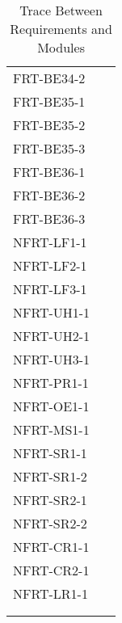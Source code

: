 \documentclass[12pt, titlepage]{article}
\begin{document}
\begin{longtable}{p{} p{}}
	FRT-BE34-2            & ~                \\
	FRT-BE35-1            & ~                \\
	FRT-BE35-2            & ~                \\
	FRT-BE35-3            & ~                \\
	FRT-BE36-1            & ~                \\
	FRT-BE36-2            & ~                \\
	FRT-BE36-3            & ~                \\
	NFRT-LF1-1            & ~                \\
	NFRT-LF2-1            & ~                \\
	NFRT-LF3-1            & ~                \\
	NFRT-UH1-1            & ~                \\
	NFRT-UH2-1            & ~                \\
	NFRT-UH3-1            & ~                \\
	NFRT-PR1-1            & ~                \\
	NFRT-OE1-1            & ~                \\
	NFRT-MS1-1            & ~                \\
	NFRT-SR1-1            & ~                \\
	NFRT-SR1-2            & ~                \\
	NFRT-SR2-1            & ~                \\
	NFRT-SR2-2            & ~                \\
	NFRT-CR1-1            & ~                \\
	NFRT-CR2-1            & ~                \\
	NFRT-LR1-1            & ~                \\
	\bottomrule
	\\
	\caption{Trace Between Requirements and Modules}
	\label{TblRT}                            \\
\end{longtable}
\end{document}

